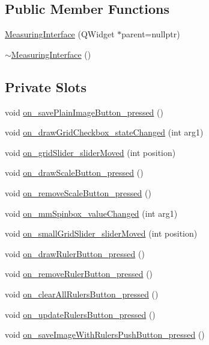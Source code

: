 \subsection*{Public Member Functions}
\begin{DoxyCompactItemize}
\item 
\mbox{\hyperlink{class_measuring_interface_ad1093726e69352028a38b18a5294a6ac}{Measuring\+Interface}} (Q\+Widget $\ast$parent=nullptr)
\item 
\mbox{\hyperlink{class_measuring_interface_ac2538499814171168011c4e26731a084}{$\sim$\+Measuring\+Interface}} ()
\end{DoxyCompactItemize}
\subsection*{Private Slots}
\begin{DoxyCompactItemize}
\item 
void \mbox{\hyperlink{class_measuring_interface_abbb97e89e646574ba20297556e666cc7}{on\+\_\+save\+Plain\+Image\+Button\+\_\+pressed}} ()
\item 
void \mbox{\hyperlink{class_measuring_interface_a37da2b051cdaef7769ac1f1f8a849753}{on\+\_\+draw\+Grid\+Checkbox\+\_\+state\+Changed}} (int arg1)
\item 
void \mbox{\hyperlink{class_measuring_interface_a5f9322ce550b248eeac9cf9cd35b6400}{on\+\_\+grid\+Slider\+\_\+slider\+Moved}} (int position)
\item 
void \mbox{\hyperlink{class_measuring_interface_a310c3915895175fe1dc14d9234095de0}{on\+\_\+draw\+Scale\+Button\+\_\+pressed}} ()
\item 
void \mbox{\hyperlink{class_measuring_interface_ac406b351a7162743198aa64bbc2a9c46}{on\+\_\+remove\+Scale\+Button\+\_\+pressed}} ()
\item 
void \mbox{\hyperlink{class_measuring_interface_ac94cdc4a4e60d0910c499b5ed496790a}{on\+\_\+mm\+Spinbox\+\_\+value\+Changed}} (int arg1)
\item 
void \mbox{\hyperlink{class_measuring_interface_af76bfc58f5f4a96c860d64dd0b650e5e}{on\+\_\+small\+Grid\+Slider\+\_\+slider\+Moved}} (int position)
\item 
void \mbox{\hyperlink{class_measuring_interface_a997fecc781bfc253f672a84a201ea846}{on\+\_\+draw\+Ruler\+Button\+\_\+pressed}} ()
\item 
void \mbox{\hyperlink{class_measuring_interface_a23015fd17f84f8b656cbf4e352b02604}{on\+\_\+remove\+Ruler\+Button\+\_\+pressed}} ()
\item 
void \mbox{\hyperlink{class_measuring_interface_a423a52e80d530b4cf1154422b3de5073}{on\+\_\+clear\+All\+Rulers\+Button\+\_\+pressed}} ()
\item 
void \mbox{\hyperlink{class_measuring_interface_a18a63bf732f8df1ed9b94450b19ef455}{on\+\_\+update\+Rulers\+Button\+\_\+pressed}} ()
\item 
void \mbox{\hyperlink{class_measuring_interface_a87fcf4623df1c9af6663fe236bb3dd0e}{on\+\_\+save\+Image\+With\+Rulers\+Push\+Button\+\_\+pressed}} ()
\end{DoxyCompactItemize}
